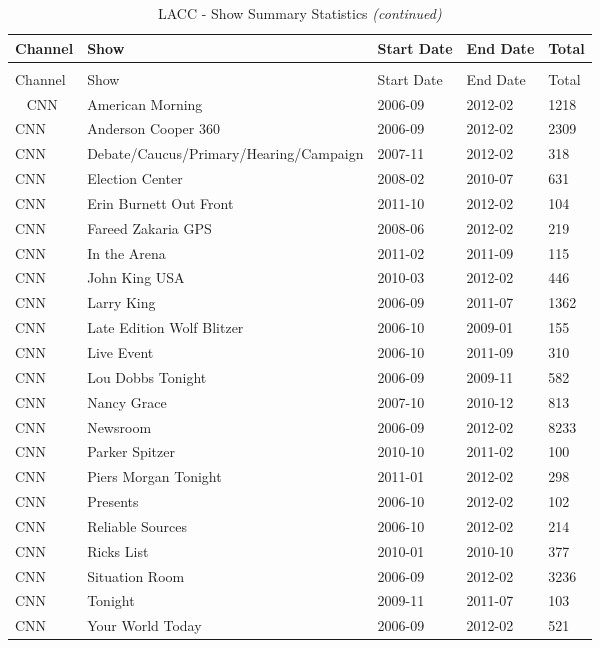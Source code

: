 \begin{longtable}{lllll}
\caption{\label{tab:tab:lacc_show}LACC - Show Summary Statistics}\\
\toprule
Channel & Show & Start Date & End Date & Total\\
\midrule
\endfirsthead
\caption[]{LACC - Show Summary Statistics \textit{(continued)}}\\
\toprule
Channel & Show & Start Date & End Date & Total\\
\midrule
\endhead
\
\endfoot
\bottomrule
\endlastfoot
CNN & American Morning & 2006-09 & 2012-02 & 1218\\
CNN & Anderson Cooper 360 & 2006-09 & 2012-02 & 2309\\
CNN & Debate/Caucus/Primary/Hearing/Campaign & 2007-11 & 2012-02 & 318\\
CNN & Election Center & 2008-02 & 2010-07 & 631\\
CNN & Erin Burnett Out Front & 2011-10 & 2012-02 & 104\\
\addlinespace
CNN & Fareed Zakaria GPS & 2008-06 & 2012-02 & 219\\
CNN & In the Arena & 2011-02 & 2011-09 & 115\\
CNN & John King USA & 2010-03 & 2012-02 & 446\\
CNN & Larry King & 2006-09 & 2011-07 & 1362\\
CNN & Late Edition Wolf Blitzer & 2006-10 & 2009-01 & 155\\
\addlinespace
CNN & Live Event & 2006-10 & 2011-09 & 310\\
CNN & Lou Dobbs Tonight & 2006-09 & 2009-11 & 582\\
CNN & Nancy Grace & 2007-10 & 2010-12 & 813\\
CNN & Newsroom & 2006-09 & 2012-02 & 8233\\
CNN & Parker Spitzer & 2010-10 & 2011-02 & 100\\
\addlinespace
CNN & Piers Morgan Tonight & 2011-01 & 2012-02 & 298\\
CNN & Presents & 2006-10 & 2012-02 & 102\\
CNN & Reliable Sources & 2006-10 & 2012-02 & 214\\
CNN & Ricks List & 2010-01 & 2010-10 & 377\\
CNN & Situation Room & 2006-09 & 2012-02 & 3236\\
\addlinespace
CNN & Tonight & 2009-11 & 2011-07 & 103\\
CNN & Your World Today & 2006-09 & 2012-02 & 521\\

\end{longtable}
